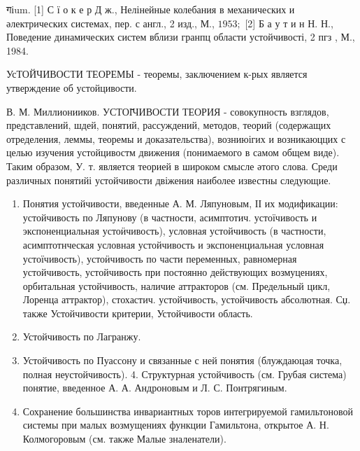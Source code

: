 \documentclass[10pt]{article}
\begin{document}
गіum. [1] С ї о к е р Д ж., Нелінейные колебания в механических и әлектрических системах, пер. с англ., 2 изд., М., $1953 ;$ [2] Б а у т и н Н. Н., Поведение динамических систем вблизи гранпц области устойчивості, 2 пгз , М., 1984.



УсТОЙЧИВОСТИ ТЕОРЕМЫ - теоремы, заключением к-рых является утверждение об устойцивости.



В. М. Миллионииков. УСТОІ̆ЧИВОСТИ ТЕОРИЯ - совокупность взглядов, представлений, шдей, понятий, рассуждений, методов, теорий (содержащих отределения, леммы, теоремы и доказательства), возниюігих и возникаюццих с целью изучения устойцивостм движения (понимаемого в самом общем виде). Таким образом, У. т. является теорией в широком смысле әтого слова. Среди различных понятийі устойчивости двіжения наиболее известны следующие.



\begin{enumerate}

  \item Понятия устойчивости, введенные А. М. Ляпуновым, ІІ их модификации: устойчивость по Ляпунову (в частности, асимптотич. устоїчивость и экспоненциальная устоӥчивость), условная устойчивость (в частности, асимптотнческая условная устойчивость и экспоненциальная условная устоїчивость), устоӥчивость по части переменных, равномерная устойчивость, устойчивость при постоянно действующих возмуцениях, орбитальная устойчивость, наличие аттракторов (см. Предельный цикл, Лоренца аттрактор), стохастич. устойчивость, устойчивость абсолютная. Сџ. также Устойчивости критерии, Устойчивости область.



  \item Устойчивость по Лагранжу.



  \item Устойчивость по Пуассону и связанные с ней понятия (блуждаюцая точка, полная неустойчивость). 4. Структурная устойчивость (см. Грубая система) понятие, введенное А. А. Андроновым и Л. С. Понтрягиным.



  \item Сохранение большинства инвариантных торов интегрируемой гамильтоновой системы при малых возмущениях функции Гамильтона, открытое А. Н. Колмогоровым (см. также Малые зналенатели).



\end{enumerate}
\end{document}
